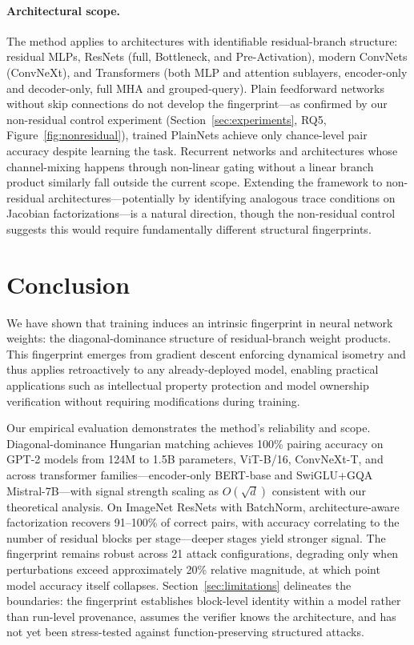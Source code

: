 \documentclass[wcp]{jmlr}
\begin{document}
\paragraph{Architectural scope.}
The method applies to architectures with identifiable residual-branch structure: residual MLPs, ResNets (full, Bottleneck, and Pre-Activation), modern ConvNets (ConvNeXt), and Transformers (both MLP and attention sublayers, encoder-only and decoder-only, full MHA and grouped-query). Plain feedforward networks without skip connections do not develop the fingerprint---as confirmed by our non-residual control experiment (Section~\ref{sec:experiments}, RQ5, Figure~\ref{fig:nonresidual}), trained PlainNets achieve only chance-level pair accuracy despite learning the task. Recurrent networks and architectures whose channel-mixing happens through non-linear gating without a linear branch product similarly fall outside the current scope. Extending the framework to non-residual architectures---potentially by identifying analogous trace conditions on Jacobian factorizations---is a natural direction, though the non-residual control suggests this would require fundamentally different structural fingerprints.

\section{Conclusion}\label{sec:conclusion}

We have shown that training induces an intrinsic fingerprint in neural network weights: the diagonal-dominance structure of residual-branch weight products. This fingerprint emerges from gradient descent enforcing dynamical isometry and thus applies retroactively to any already-deployed model, enabling practical applications such as intellectual property protection and model ownership verification without requiring modifications during training.

Our empirical evaluation demonstrates the method's reliability and scope. Diagonal-dominance Hungarian matching achieves 100\% pairing accuracy on GPT-2 models from 124M to 1.5B parameters, ViT-B/16, ConvNeXt-T, and across transformer families---encoder-only BERT-base and SwiGLU+GQA Mistral-7B---with signal strength scaling as $O(\sqrt{d})$ consistent with our theoretical analysis. On ImageNet ResNets with BatchNorm, architecture-aware factorization recovers 91--100\% of correct pairs, with accuracy correlating to the number of residual blocks per stage---deeper stages yield stronger signal. The fingerprint remains robust across 21 attack configurations, degrading only when perturbations exceed approximately 20\% relative magnitude, at which point model accuracy itself collapses. Section~\ref{sec:limitations} delineates the boundaries: the fingerprint establishes block-level identity within a model rather than run-level provenance, assumes the verifier knows the architecture, and has not yet been stress-tested against function-preserving structured attacks.
\end{document}
